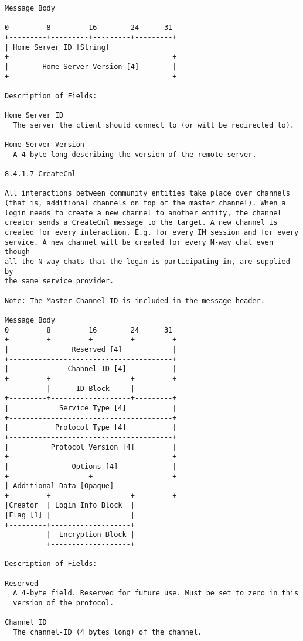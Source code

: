\documentclass[titlepage,oneside]{book}
\begin{document}
\begin{verbatim}
Message Body

0         8         16        24      31
+---------+---------+---------+---------+
| Home Server ID [String]
+---------------------------------------+
|        Home Server Version [4]        |
+---------------------------------------+

Description of Fields:

Home Server ID
  The server the client should connect to (or will be redirected to).

Home Server Version
  A 4-byte long describing the version of the remote server.

8.4.1.7 CreateCnl

All interactions between community entities take place over channels
(that is, additional channels on top of the master channel). When a
login needs to create a new channel to another entity, the channel
creator sends a CreateCnl message to the target. A new channel is
created for every interaction. E.g. for every IM session and for every
service. A new channel will be created for every N-way chat even though
all the N-way chats that the login is participating in, are supplied by
the same service provider.

Note: The Master Channel ID is included in the message header.

Message Body
0         8         16        24      31
+---------+---------+---------+---------+
|               Reserved [4]            |
+---------------------------------------+
|              Channel ID [4]           |
+---------+-------------------+---------+
          |      ID Block     |
+---------+-------------------+---------+
|            Service Type [4]           |
+---------------------------------------+
|           Protocol Type [4]           |
+---------------------------------------+
|          Protocol Version [4]         |
+---------------------------------------+
|               Options [4]             |
+-------------------+-------------------+
| Additional Data [Opaque]
+---------+-------------------+---------+
|Creator  | Login Info Block  |
|Flag [1] |                   |
+---------+-------------------+
          |  Encryption Block |
          +-------------------+

Description of Fields:

Reserved
  A 4-byte field. Reserved for future use. Must be set to zero in this
  version of the protocol.

Channel ID
  The channel-ID (4 bytes long) of the channel.


\end{verbatim}
\end{document}
